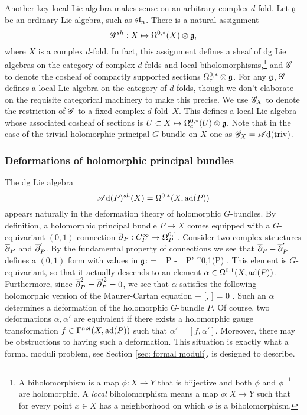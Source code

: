 \begin{eg}
Another key local Lie algebra makes sense on an arbitrary complex $d$-fold.
Let $\mathfrak g$ be an ordinary Lie algebra, such as ${\frak{s}\frak{l}}_n$.
There is a natural assignment 
\[
\mathscr G^{sh} : X \mapsto \Omega^{0,*}(X) \otimes \mathfrak g,
\]
where $X$ is a complex $d$-fold.
In fact, this assignment defines a sheaf of dg Lie algebras on the category of complex $d$-folds and local biholomorphisms,\footnote{A biholomorphism is a map $\phi: X \to Y$ that is biijective and both $\phi$ and $\phi^{-1}$ are holomorphic. A {\em local} biholomorphism means a map $\phi: X \to Y$ such that for every point $x \in X$ has a neighborhood on which $\phi$ is a biholomorphism.}
and $\mathscr G$ to denote the cosheaf of compactly supported sections $\Omega^{0,*}_c \otimes \mathfrak g$.
For any $\mathfrak g$, $\mathscr G$ defines a local Lie algebra on the category of $d$-folds, though we don't elaborate on the requisite categorical machinery to make this precise.
We use $\mathscr G_X$ to denote the restriction of $\mathscr G$ to a fixed complex $d$-fold~$X$.
This defines a local Lie algebra whose associated cosheaf of sections is $U \subset X \mapsto \Omega^{0,*}_c(U) \otimes \mathfrak g$.
Note that in the case of the trivial holomorphic principal $G$-bundle on $X$ one as $\mathscr G_X = \mathscr A{\rm d}({\rm triv})$. 
\end{eg}
 
\subsubsection{Deformations of holomorphic principal bundles}

The dg Lie algebra $$\mathscr A{\rm d}(P)^{sh}(X) = \Omega^{0,*}(X, {\rm ad}(P))$$ appears naturally in the deformation theory of holomorphic $G$-bundles. 
By definition, a holomorphic principal bundle $P \to X$ comes equipped with a $G$-equivariant $(0,1)$-connection $\overline{\partial}_P : C^\infty_P \to \Omega^{0,1}_P$. 
Consider two complex structures $\overline{\partial}_P$ and $\overline{\partial}_P'$. 
By the fundamental property of connections we see that $\overline{\partial}_P - \overline{\partial}_P'$ defines a $(0,1)$ form with values in $\mathfrak g$:
\ben
\alpha = \dbar_P - \dbar_P' \in \Omega^{0,1}(P) \tensor \fg .
\een
This element is $G$-equivariant, so that it actually descends to an element $\alpha \in \Omega^{0,1}(X, {\rm ad}(P))$. 
Furthermore, since $\overline{\partial}_P^2 = \overline{\partial}_P'^2 = 0$, we see that $\alpha$ satisfies the following holomorphic version of the Maurer-Cartan equation
\ben
\dbar \alpha +  [\alpha, \alpha] = 0 .
\een
Such an $\alpha$ determines a deformation of the holomorphic $G$-bundle $P$.
Of course, two deformations $\alpha,\alpha'$ are equivalent if there exists a holomorphic gauge transformation $f \in \Gamma^{hol}(X, {\rm ad}(P))$ such that $\alpha' = [f, \alpha']$. 
Moreover, there may be obstructions to having such a deformation. 
This situation is exactly what a formal moduli problem, see Section \ref{sec: formal moduli}, is designed to describe.

